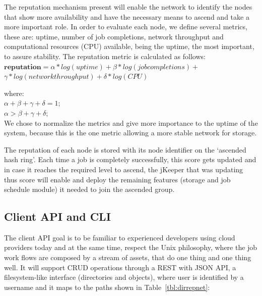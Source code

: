 The reputation mechanism present will enable the network to identify the nodes that show more availability and have the necessary means to ascend and take a more important role. In order to evaluate each node, we define several metrics, these are: uptime, number of job completions, network throughput and computational resources (CPU) available, being the uptime, the most important, to assure stability. The reputation metric is calculated as follows: \\

$ \textbf{reputation} = \alpha * log(uptime) + \beta * log(job completions) + $ \\
$          \gamma * log(network throughput) + \delta * log (CPU)$

where: \\
  $\alpha+ \beta+ \gamma+ \delta = 1$; \\
  $\alpha > \beta + \gamma + \delta$;  \\

We chose to normalize the metrics and give more importance to the uptime of the system, because this is the one metric allowing a more stable network for storage.

The reputation of each node is stored with its node identifier on the `ascended hash ring'. Each time a job is completely successfully, this score gets updated and in case it reaches the required level to ascend, the jKeeper that was updating thus score will enable and deploy the remaining features (storage and job schedule module) it needed to join the ascended group. 

\subsection{Client API and CLI}

The client API goal is to be familiar to experienced developers using cloud providers today and at the same time, respect the Unix philosophy, where the job work flows are composed by a stream of assets, that do one thing and one thing well. It will support CRUD operations through a REST with JSON API, a filesystem-like interface (directories and objects), where user is identified by a username and it maps to the paths shown in Table~\ref{tbl:dirrepnet}: 

